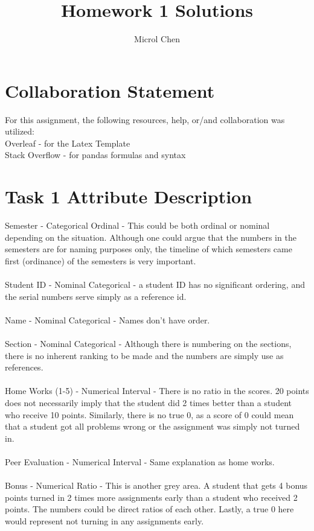 \documentclass{article}
\title{Homework 1 Solutions}
\author{Microl Chen}
\begin{document}
\maketitle

\section{Collaboration Statement}
For this assignment, the following resources, help, or/and collaboration was utilized:
\\Overleaf - for the Latex Template
\\Stack Overflow - for pandas formulas and syntax


\section{Task 1 Attribute Description}
Semester - Categorical Ordinal - This could be both ordinal or nominal depending on the situation. Although one could argue that the numbers in the semesters are for naming purposes only, the timeline of which semesters came first (ordinance) of the semesters is very important.
\\\\Student ID - Nominal Categorical - a student ID has no significant ordering, and the serial numbers serve simply as a reference id.
\\\\Name - Nominal Categorical - Names don't have order.
\\\\Section -  Nominal Categorical - Although there is numbering on the sections, there is no inherent ranking to be made and the numbers are simply use as references.
\\\\Home Works (1-5) - Numerical Interval - There is no ratio in the scores. 20 points does not necessarily imply that the student did 2 times better than a student who receive 10 points. Similarly, there is no true 0, as a score of 0 could mean that a student got all problems wrong or the assignment was simply not turned in.
\\\\Peer Evaluation - Numerical Interval - Same explanation as home works.
\\\\Bonus - Numerical Ratio - This is another grey area. A student that gets 4 bonus points turned in 2 times more assignments early than a student who received 2 points. The numbers could be direct ratios of each other. Lastly, a true 0 here would represent not turning in any assignments early.
\end{document}
